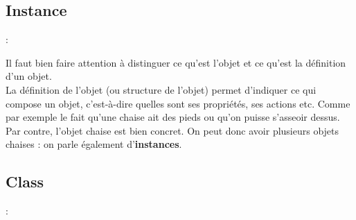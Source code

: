 \documentclass[a4paper,12pt,openany]{book}
\begin{document}
\subsection{Instance}: \\

\begin{flushleft}
Il faut bien faire attention à distinguer ce qu’est l’objet et ce qu'est la définition d’un objet.\\
La définition de l’objet (ou structure de l’objet) permet d’indiquer ce qui compose un objet, c'est-à-dire quelles sont ses propriétés, ses actions etc. Comme par exemple le fait qu’une chaise ait des pieds ou qu’on puisse s’asseoir dessus.\\
Par contre, l’objet chaise est bien concret. On peut donc avoir plusieurs objets chaises : on parle également d’\textbf{instances}.\\
\end{flushleft}

\subsection{Class}: \\
\end{document}
